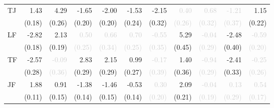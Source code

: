 \begin{tabular}{lrrrrrrrrrr}
\multirow{2}{*}{TJ} &1.43 &4.29 &-1.65 &-2.00 &-1.53 &-2.15 &\cellcolor{Gray}\textcolor{LightGray}{0.40} &\textcolor{LightGray}{0.68} &\textcolor{LightGray}{-1.21} &1.15\\
 &\tiny{(0.18)} &\tiny{(0.26)} &\tiny{(0.20)} &\tiny{(0.20)} &\tiny{(0.24)} &\tiny{(0.32)} &\cellcolor{Gray}\textcolor{LightGray}{\tiny{(0.26)}} &\textcolor{LightGray}{\tiny{(0.32)}} &\textcolor{LightGray}{\tiny{(0.37)}} &\tiny{(0.22)}\\[1ex]
\multirow{2}{*}{LF} &-2.82 &2.13 &\textcolor{LightGray}{0.50} &\textcolor{LightGray}{0.66} &\textcolor{LightGray}{0.70} &\textcolor{LightGray}{-0.55} &5.29 &\cellcolor{Gray}\textcolor{LightGray}{-0.04} &-2.48 &\textcolor{LightGray}{-0.59}\\
 &\tiny{(0.18)} &\tiny{(0.19)} &\textcolor{LightGray}{\tiny{(0.25)}} &\textcolor{LightGray}{\tiny{(0.34)}} &\textcolor{LightGray}{\tiny{(0.25)}} &\textcolor{LightGray}{\tiny{(0.35)}} &\tiny{(0.45)} &\cellcolor{Gray}\textcolor{LightGray}{\tiny{(0.29)}} &\tiny{(0.40)} &\textcolor{LightGray}{\tiny{(0.20)}}\\[1ex]
\multirow{2}{*}{TF} &-2.57 &\textcolor{LightGray}{-0.09} &2.83 &2.15 &0.99 &\textcolor{LightGray}{-0.17} &1.40 &\textcolor{LightGray}{-0.94} &\cellcolor{Gray}-2.41 &\textcolor{LightGray}{-0.25}\\
 &\tiny{(0.28)} &\textcolor{LightGray}{\tiny{(0.36)}} &\tiny{(0.29)} &\tiny{(0.29)} &\tiny{(0.27)} &\textcolor{LightGray}{\tiny{(0.39)}} &\tiny{(0.36)} &\textcolor{LightGray}{\tiny{(0.29)}} &\cellcolor{Gray}\tiny{(0.33)} &\textcolor{LightGray}{\tiny{(0.26)}}\\[1ex]
\multirow{2}{*}{JF} &1.88 &0.91 &-1.38 &-1.46 &-0.53 &\textcolor{LightGray}{0.30} &2.09 &\textcolor{LightGray}{-0.04} &\textcolor{LightGray}{0.13} &\cellcolor{Gray}\textcolor{LightGray}{0.54}\\
 &\tiny{(0.11)} &\tiny{(0.15)} &\tiny{(0.14)} &\tiny{(0.15)} &\tiny{(0.14)} &\textcolor{LightGray}{\tiny{(0.20)}} &\tiny{(0.21)} &\textcolor{LightGray}{\tiny{(0.19)}} &\textcolor{LightGray}{\tiny{(0.29)}} &\cellcolor{Gray}\textcolor{LightGray}{\tiny{(0.17)}}\\[1ex]
\bottomrule
\end{tabular}
